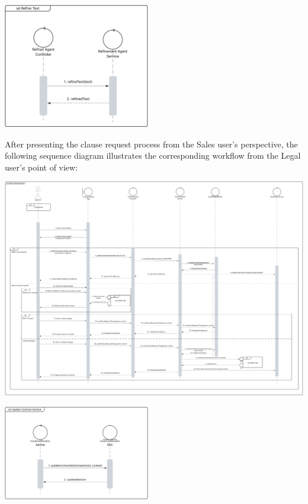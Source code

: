 \begin{center}
    \centering
    \includegraphics[width=0.48\textwidth]{Images/Sequence Diagram - Refine Text Ref.png}
    \label{fig:sequence_diagram_refine_text}
\end{center}

After presenting the clause request process from the Sales user's perspective, the following sequence diagram illustrates the corresponding workflow from the Legal user's point of view:

\begin{center}
    \centering
    \includegraphics[width=1\textwidth]{Images/Sequence Diagram - Legal - Clause Request.png}
    \label{fig:sequence_diagram_clause_request_legal}
\end{center}

\begin{center}
    \centering
    \includegraphics[width=0.48\textwidth]{Images/Sequence Diagram - Update Sections Ref.png}
    \label{fig:sequence_diagram_update_contract_sections}
\end{center}

